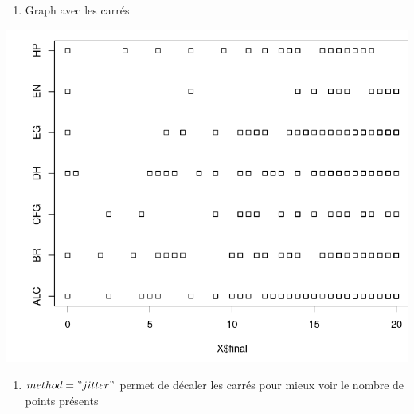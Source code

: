 \documentclass[
]{article}
\newenvironment{Shaded}{}{}
\newcommand{\DataTypeTok}[1]{\textcolor[rgb]{0.56,0.13,0.00}{#1}}
\newcommand{\KeywordTok}[1]{\textcolor[rgb]{0.00,0.44,0.13}{\textbf{#1}}}
\newcommand{\NormalTok}[1]{#1}
\newcommand{\OperatorTok}[1]{\textcolor[rgb]{0.40,0.40,0.40}{#1}}
\newcommand{\StringTok}[1]{\textcolor[rgb]{0.25,0.44,0.63}{#1}}
\providecommand{\tightlist}{%
  \setlength{\itemsep}{0pt}\setlength{\parskip}{0pt}}
\begin{document}
\begin{enumerate}
\def\labelenumi{\arabic{enumi}.}
\setcounter{enumi}{31}
\tightlist
\item
  Graph avec les carrés
\end{enumerate}

\begin{Shaded}
\end{Shaded}

\includegraphics{img/stripchart.png}

\begin{enumerate}
\def\labelenumi{\arabic{enumi}.}
\setcounter{enumi}{32}
\tightlist
\item
  \(method = "jitter"\) permet de décaler les carrés pour mieux voir le
  nombre de points présents
\end{enumerate}

\begin{Shaded}
\end{Shaded}
\end{document}
